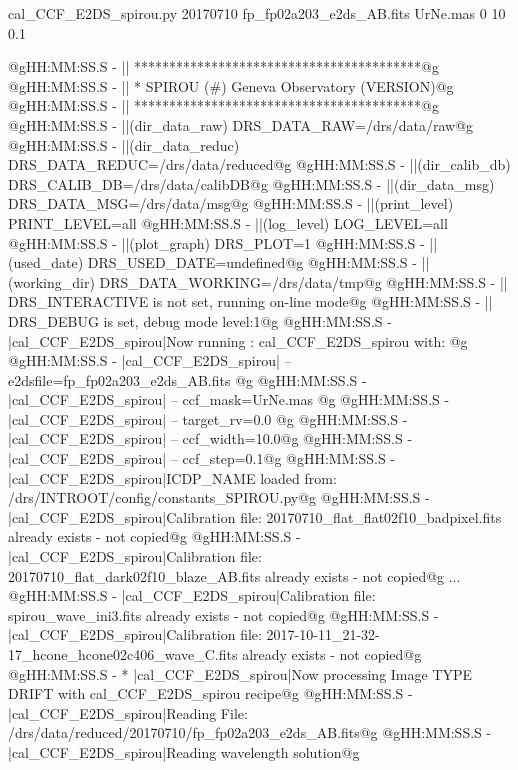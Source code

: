 \begin{cmdbox}[title={example}]
cal_CCF_E2DS_spirou.py 20170710 fp_fp02a203_e2ds_AB.fits UrNe.mas 0 10 0.1
\end{cmdbox}
\begin{cmdboxprintspecial}[fontupper=\tiny, fontlower=\tiny]
@gHH:MM:SS.S -   || *****************************************@g
@gHH:MM:SS.S -   || * SPIROU \@(#) Geneva Observatory (VERSION)@g
@gHH:MM:SS.S -   || *****************************************@g
@gHH:MM:SS.S -   ||(dir_data_raw)      DRS_DATA_RAW=/drs/data/raw@g
@gHH:MM:SS.S -   ||(dir_data_reduc)    DRS_DATA_REDUC=/drs/data/reduced@g
@gHH:MM:SS.S -   ||(dir_calib_db)      DRS_CALIB_DB=/drs/data/calibDB@g
@gHH:MM:SS.S -   ||(dir_data_msg)      DRS_DATA_MSG=/drs/data/msg@g
@gHH:MM:SS.S -   ||(print_level)       PRINT_LEVEL=all         %
@gHH:MM:SS.S -   ||(log_level)         LOG_LEVEL=all         %
@gHH:MM:SS.S -   ||(plot_graph)        DRS_PLOT=1            %
@gHH:MM:SS.S -   ||(used_date)         DRS_USED_DATE=undefined@g
@gHH:MM:SS.S -   ||(working_dir)       DRS_DATA_WORKING=/drs/data/tmp@g
@gHH:MM:SS.S -   ||                    DRS_INTERACTIVE is not set, running on-line mode@g
@gHH:MM:SS.S -   ||                    DRS_DEBUG is set, debug mode level:1@g
@gHH:MM:SS.S -   |cal_CCF_E2DS_spirou|Now running : cal_CCF_E2DS_spirou with: @g
@gHH:MM:SS.S -   |cal_CCF_E2DS_spirou|       -- e2dsfile=fp_fp02a203_e2ds_AB.fits @g
@gHH:MM:SS.S -   |cal_CCF_E2DS_spirou|       -- ccf_mask=UrNe.mas @g
@gHH:MM:SS.S -   |cal_CCF_E2DS_spirou|       -- target_rv=0.0 @g
@gHH:MM:SS.S -   |cal_CCF_E2DS_spirou|       -- ccf_width=10.0@g
@gHH:MM:SS.S -   |cal_CCF_E2DS_spirou|       -- ccf_step=0.1@g
@gHH:MM:SS.S -   |cal_CCF_E2DS_spirou|ICDP_NAME loaded from: /drs/INTROOT/config/constants_SPIROU.py@g
@gHH:MM:SS.S -   |cal_CCF_E2DS_spirou|Calibration file: 20170710_flat_flat02f10_badpixel.fits already exists - not copied@g
@gHH:MM:SS.S -   |cal_CCF_E2DS_spirou|Calibration file: 20170710_flat_dark02f10_blaze_AB.fits already exists - not copied@g
...
@gHH:MM:SS.S -   |cal_CCF_E2DS_spirou|Calibration file: spirou_wave_ini3.fits already exists - not copied@g
@gHH:MM:SS.S -   |cal_CCF_E2DS_spirou|Calibration file: 2017-10-11_21-32-17_hcone_hcone02c406_wave_C.fits already exists - not copied@g
@gHH:MM:SS.S - * |cal_CCF_E2DS_spirou|Now processing Image TYPE DRIFT with cal_CCF_E2DS_spirou recipe@g
@gHH:MM:SS.S -   |cal_CCF_E2DS_spirou|Reading File: /drs/data/reduced/20170710/fp_fp02a203_e2ds_AB.fits@g
@gHH:MM:SS.S -   |cal_CCF_E2DS_spirou|Reading wavelength solution@g

\end{cmdboxprintspecial}
